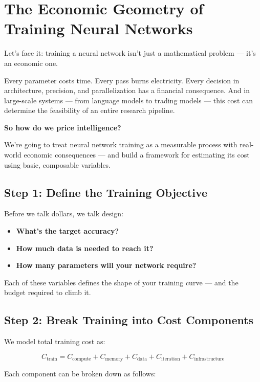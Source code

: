 \section{The Economic Geometry of Training Neural Networks}

Let’s face it: training a neural network isn’t just a mathematical problem — it’s an economic one.

Every parameter costs time. Every pass burns electricity. Every decision in architecture, precision, and parallelization has a financial consequence. And in large-scale systems — from language models to trading models — this cost can determine the feasibility of an entire research pipeline.

\textbf{So how do we price intelligence?}

We’re going to treat neural network training as a measurable process with real-world economic consequences — and build a framework for estimating its cost using basic, composable variables.

\subsection{Step 1: Define the Training Objective}

Before we talk dollars, we talk design:

\begin{itemize}
    \item \textbf{What’s the target accuracy?}
    \item \textbf{How much data is needed to reach it?}
    \item \textbf{How many parameters will your network require?}
\end{itemize}

Each of these variables defines the shape of your training curve — and the budget required to climb it.

\subsection{Step 2: Break Training into Cost Components}

We model total training cost as:

\[
C_{\text{train}} = C_{\text{compute}} + C_{\text{memory}} + C_{\text{data}} + C_{\text{iteration}} + C_{\text{infrastructure}}
\]

Each component can be broken down as follows:

